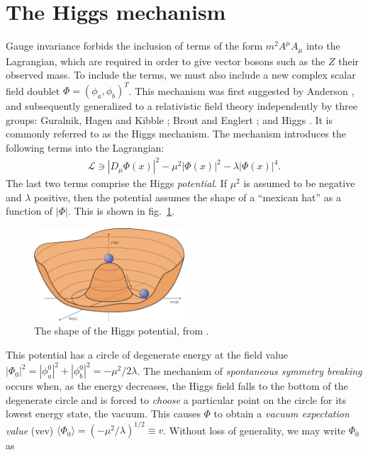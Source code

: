 \documentclass[twoside,english]{uiofysmaster}
\begin{document}
\section{The Higgs mechanism}
Gauge invariance forbids the inclusion of terms of the form $m^2A^\mu A_\mu$ into the Lagrangian, which are required in order to give vector bosons such as the $Z$ their observed mass. To include the terms, we must also include a new complex scalar field doublet $\Phi = (\phi_a, \phi_b)^T$. This mechanism was first suggested by Anderson \cite{1963PhRv..130..439A}, and subsequently generalized to a relativistic field theory independently by three groups: Guralnik, Hagen and Kibble \cite{1964PhRvL..13..585G}; Brout and Englert \cite{1964PhRvL..13..321E}; and Higgs \cite{Higgs:1964pj}. It is commonly referred to as the Higgs mechanism. The mechanism introduces the following terms into the Lagrangian:
\begin{align}
	\mathcal L \ni |D_\mu \Phi(x)|^2 - \mu^2|\Phi(x)|^2 - \lambda |\Phi(x)|^4.\label{eq:higgs_lagrange}
\end{align}
The last two terms comprise the Higgs {\it potential}. If $\mu^2$ is assumed to be negative and $\lambda$ positive, then the potential assumes the shape of a ``mexican hat'' as a function of $|\Phi|$. This is shown in fig.\ \ref{fig:higgspot}.
\begin{figure}[hbt]
	\centering
	\includegraphics[width=0.5\textwidth]{figures/susyintro/higgspot_nature.jpg}
	\caption{The shape of the Higgs potential, from \cite{Ellis:higgs}.}
	\label{fig:higgspot}
\end{figure}
This potential has a circle of degenerate energy at the field value $|\Phi_0|^2 = |\phi_a^0|^2 + |\phi_b^0|^2 = -\mu^2/2\lambda$. The mechanism of {\it spontaneous symmetry breaking} occurs when, as the energy decreases, the Higgs field falls to the bottom of the degenerate circle and is forced to {\it choose} a particular point on the circle for its lowest energy state, the vacuum. This causes $\Phi$ to obtain a {\it vacuum expectation value} (vev) $\langle \Phi_0 \rangle = (-\mu^2/\lambda)^{1/2} \equiv v$. Without loss of generality, we may write $\Phi_0$ as
\end{document}
